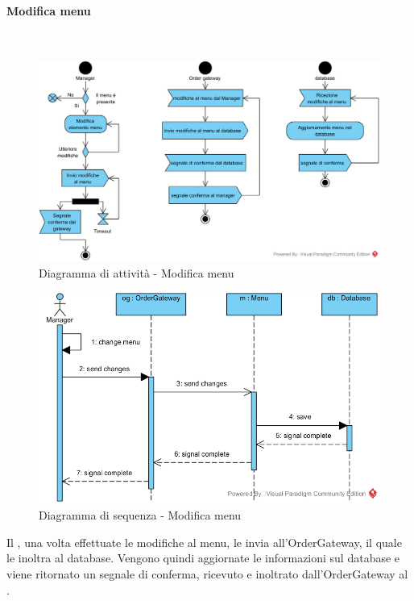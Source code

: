 \paragraph{Modifica menu}\mbox{}\\
\nopagebreak
\begin{figure}[H]
	\centering
	\includegraphics[width=14cm]{diagrammi_img/attivita/manager_menu_modifiche.png}
	\caption{Diagramma di attività - Modifica menu}
\end{figure}

\begin{figure}[H]
	\centering
	\includegraphics[width=14cm]{../../documenti/SpecificaTecnica/diagrammi_img/sequenza/direttore_modifica_menu.png}
	\caption{Diagramma di sequenza - Modifica menu}
\end{figure}
Il \Manager{}, una volta effettuate le modifiche al menu, le invia all'Order\-Gateway, il quale le inoltra al database. Vengono quindi aggiornate le informazioni sul database e viene ritornato un segnale di conferma, ricevuto e inoltrato dall'Order\-Gateway al \Manager{}.


